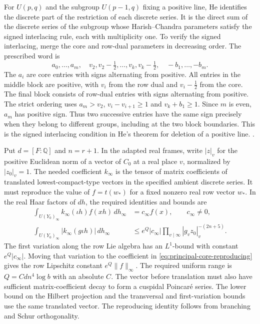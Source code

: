 For \(U(p,q)\) and the subgroup \(U(p-1,q)\) fixing a
positive line, He identifies the discrete part of the restriction
of each discrete series. It is the direct sum of the discrete series
of the subgroup whose Harish--Chandra parameters satisfy the signed
interlacing rule, each with multiplicity one.
\cite[Theorem~0.1]{depth-he}
To verify the signed interlacing, merge the core and
row-dual parameters in decreasing order. The prescribed
word is
\[
 a_0,\ldots,a_m,\quad
 v_2,v_2-\tfrac12,\ldots,v_k,v_k-\tfrac12,\quad
 -b_1,\ldots,-b_m.
\]
The \(a_i\) are core entries with signs alternating from
positive. All entries in the middle block are positive,
with \(v_i\) from the row dual and \(v_i-\tfrac12\) from
the core. The final block consists of row-dual entries
with signs alternating from positive. The strict ordering
uses \(a_m>v_2\), \(v_i-v_{i+1}\ge1\) and \(v_k+b_1\ge1\).
Since \(m\) is even, \(a_m\) has positive sign. Thus two
successive entries have the same sign precisely when
they belong to different groups, including at the two
block boundaries. This is the signed interlacing condition
in He's theorem for deletion of a positive line.
.

Put \(d=[F:\mathbb Q]\) and \(n=r+1\). In the adapted real frames,
write \(|z|_v\) for the positive Euclidean norm of a vector of
\(C_0\) at a real place \(v\), normalized by \(|z_0|_v=1\).
The needed coefficient \(k_\infty\) is the tensor of matrix
coefficients of translated lowest-compact-type vectors in the
specified ambient discrete series. It must reproduce the value of
\(f=t(w_*)\) for a fixed nonzero real row vector \(w_*\). In the
real Haar factors of \(dh\), the required identities and bounds are
\begin{align}
 \int_{U(Y_0)_\infty} k_\infty(\iota h)f(xh)\,dh_\infty
   &= c_\infty f(x), \qquad c_\infty\ne0,
   \label{eq:principal-core-reproducing}\\
 \int_{U(Y_0)_\infty}|k_\infty(g\iota h)|\,dh_\infty
   &\le e^Q|c_\infty|
      \prod_{v\mid\infty}|g_v z_0|_v^{-(2n+5)} .
   \label{eq:principal-core-transversal}
\end{align}
The first variation along the row Lie algebra has an
\(L^1\)-bound with constant \(e^Q|c_\infty|\). Moving that variation
to the coefficient in \eqref{eq:principal-core-reproducing} gives
the row Lipschitz constant \(e^Q\|f\|_\infty\). The required
uniform range is \(Q=C d n^4\log b\) with an absolute \(C\).
The vector before translation must also have sufficient
matrix-coefficient decay to form a cuspidal Poincar\'e series.
The lower bound on the Hilbert projection and the
transversal and first-variation bounds use the same translated
vector. The reproducing identity follows from branching and
Schur orthogonality.

